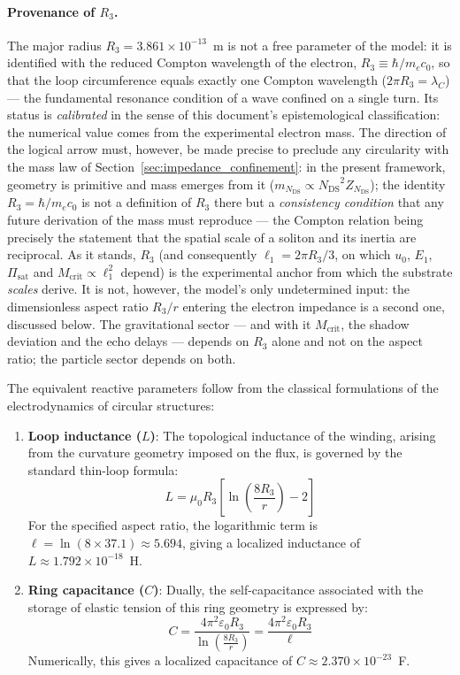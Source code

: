 \documentclass[11pt,a4paper]{article}
\theoremstyle{plain}
\theoremstyle{remark}
\newcommand{\Ncd}{\ensuremath{N_{\mathrm{DS}}}}
\begin{document}
\paragraph{Provenance of $R_3$.}
The major radius $R_3 = 3.861\times10^{-13}$~m is not a free parameter of the model: it is identified with the reduced Compton wavelength of the electron, $R_3 \equiv \hbar/m_e c_0$, so that the loop circumference equals exactly one Compton wavelength ($2\pi R_3 = \lambda_C$) --- the fundamental resonance condition of a wave confined on a single turn. Its status is \emph{calibrated} in the sense of this document's epistemological classification: the numerical value comes from the experimental electron mass. The direction of the logical arrow must, however, be made precise to preclude any circularity with the mass law of Section~\ref{sec:impedance_confinement}: in the present framework, geometry is primitive and mass emerges from it ($m_{\Ncd} \propto \Ncd^2 Z_{\Ncd}$); the identity $R_3 = \hbar/m_e c_0$ is not a definition of $R_3$ there but a \emph{consistency condition} that any future derivation of the mass must reproduce --- the Compton relation being precisely the statement that the spatial scale of a soliton and its inertia are reciprocal. As it stands, $R_3$ (and consequently $\ell_1 = 2\pi R_3/3$, on which $u_0$, $E_1$, $\Pi_{\text{sat}}$ and $M_{\text{crit}} \propto \ell_1^2$ depend) is the experimental anchor from which the substrate \emph{scales} derive. It is not, however, the model's only undetermined input: the dimensionless aspect ratio $R_3/r$ entering the electron impedance is a second one, discussed below. The gravitational sector --- and with it $M_{\text{crit}}$, the shadow deviation and the echo delays --- depends on $R_3$ alone and not on the aspect ratio; the particle sector depends on both.

The equivalent reactive parameters follow from the classical formulations of the electrodynamics of circular structures:

\begin{enumerate}
    \item \textbf{Loop inductance ($L$)}: The topological inductance of the winding, arising from the curvature geometry imposed on the flux, is governed by the standard thin-loop formula:
    \begin{equation}
    L = \mu_0 R_3 \left[ \ln\left(\frac{8R_3}{r}\right) - 2 \right]
    \end{equation}
    For the specified aspect ratio, the logarithmic term is $\ell = \ln(8 \times 37.1) \approx 5.694$, giving a localized inductance of $L \approx 1.792 \times 10^{-18}$~H.

    \item \textbf{Ring capacitance ($C$)}: Dually, the self-capacitance associated with the storage of elastic tension of this ring geometry is expressed by:
    \begin{equation}
    C = \frac{4\pi^2 \varepsilon_0 R_3}{\ln\left(\frac{8R_3}{r}\right)} = \frac{4\pi^2 \varepsilon_0 R_3}{\ell}
    \end{equation}
    Numerically, this gives a localized capacitance of $C \approx 2.370 \times 10^{-23}$~F.
\end{enumerate}
\end{document}

